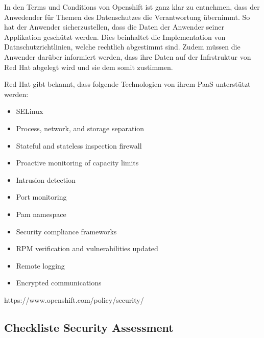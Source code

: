 \documentclass[12pt,a4paper]{article}
\begin{document}
In den Terms und Conditions von Openshift ist ganz klar zu entnehmen, dass der Anwedender für Themen des Datenschutzes die Verantwortung übernimmt.
So hat der Anwender sicherzustellen, dass die Daten der Anwender seiner Applikation geschützt werden. Dies beinhaltet die Implementation von
Datnschutzrichtlinien, welche rechtlich abgestimmt sind. Zudem müssen die Anwender darüber informiert werden, dass ihre Daten auf der Infrstruktur
von Red Hat abgelegt wird und sie dem somit zustimmen.

Red Hat gibt bekannt, dass folgende Technologien von ihrem PaaS unterstützt werden:

\begin{itemize}
    \item SELinux
    \item Process, network, and storage separation
    \item Stateful and stateless inspection firewall
    \item Proactive monitoring of capacity limits
    \item Intrusion detection
    \item Port monitoring
    \item Pam namespace
    \item Security compliance frameworks
    \item RPM verification and vulnerabilities updated
    \item Remote logging
    \item Encrypted communications
\end{itemize}
https://www.openshift.com/policy/security/

\subsection{Checkliste Security Assessment}
\end{document}
